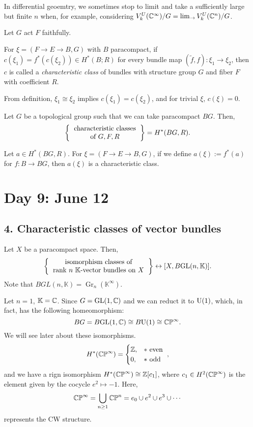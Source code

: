 \documentclass{../../../small}
\DeclareMathOperator{\Gr}{Gr}
\begin{document}
In differential geoemtry, we sometimes stop to limit and take a sufficiently large but finite $n$ when, for example, considering $V_k^U(\mathbb{C}^\infty)/G=\lim_\to V_k^U(\mathbb{C}^n)/G$.

Let $G$ act $F$ faithfully.

\begin{defn*}[3.11]
For $\xi=(F\to E\to B,G)$ with $B$ paracompact,
if $c(\xi_1)=f^*(c(\xi_2))\in H^*(B;R)$ for every bundle map $(\tilde f,f):\xi_1\to\xi_2$, then $c$ is called a \emph{characteristic class} of bundles with structure group $G$ and fiber $F$ with coefficient $R$.
\end{defn*}
From definition, $\xi_1\cong\xi_2$ implies $c(\xi_1)=c(\xi_2)$, and for trivial $\xi$, $c(\xi)=0$.

\begin{prop*}[3.12]
Let $G$ be a topological group such that we can take paracompact $BG$.
Then,
\[\left\{\begin{tabular}{c}
characteristic classes\\
of $G,F,R$
\end{tabular}\right\}=H^*(BG,R).\]
\end{prop*}
Let $a\in H^*(BG,R)$.
For $\xi=(F\to E\to B,G)$, if we define $a(\xi):=f^*(a)$ for $f:B\to BG$, then $a(\xi)$ is a characteristic class.




\newpage
\section{Day 9: June 12}

\subsection*{4. Characteristic classes of vector bundles}

Let $X$ be a paracompact space.
Then,
\[\left\{\begin{tabular}{c}
isomorphism classes of\\
rank $n$ $\mathbb{K}$-vector bundles on $X$
\end{tabular}\right\}
\leftrightarrow[X,B\GL(n,\mathbb{K})].\]
Note that $BGL(n,\mathbb{K})=\Gr_n(\mathbb{K}^\infty)$.

\begin{ex*}
Let $n=1$, $\mathbb{K}=\mathbb{C}$.
Since $G=\mathrm{GL}(1,\mathbb{C})$ and we can reduct it to $\mathrm{U}(1)$, which, in fact, has the following homeomorphism:
\[BG=B\mathrm{GL}(1,\mathbb{C})\cong B\mathrm{U}(1)\cong\mathbb{CP}^\infty.\]
We will see later about these isomorphisms.
\[H^*(\mathbb{CP}^\infty)=\begin{cases}
	\mathbb{Z},&*\text{ even }\\ 0,&*\text{ odd }
\end{cases},\]
and we have a rign isomorphism $H^*(\mathbb{CP}^\infty)\cong\mathbb{Z}[c_1]$, where $c_1\in H^2(\mathbb{CP}^\infty)$ is the element given by the cocycle $e^2\mapsto-1$.
Here,
\[\mathbb{CP}^\infty=\bigcup_{n\ge1}\mathbb{CP}^n=e_0\cup e^2\cup e^3\cup\cdots\]
represents the CW structure.
\end{ex*}
\end{document}
